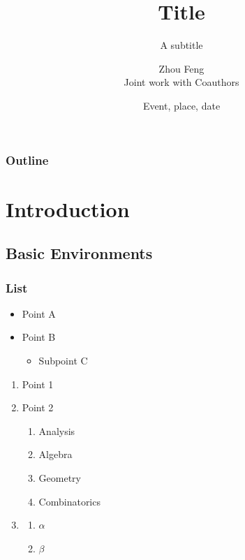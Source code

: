 \documentclass{beamer}
\title[]{Title}
\subtitle{A subtitle}
\author[Z. Feng]{Zhou Feng \\ \vspace{0.5em} Joint work with Coauthors}
\institute[Technion]{Technion -- Israel Institute of Technology}
\date{\footnotesize{Event, place, date} %
} %
\begin{document}
	
\begin{frame}[plain]
	\maketitle
\end{frame}

\begin{frame}\label{contents}
	\frametitle{Outline}
	\tableofcontents
\end{frame}


\section{Introduction} \label{sec:intro}

\subsection{Basic Environments}
\begin{frame}
	\frametitle{List}
	\begin{itemize}
		\item Point A
		\item Point B
		      \begin{itemize}
			      \item Subpoint C
		      \end{itemize}
	\end{itemize}

	\begin{enumerate}
		\item Point 1 \pause
		\item Point 2
		      \begin{enumerate}[I]
			      \item Analysis
			      \item Algebra
			      \item Geometry
			      \item Combinatorics
		      \end{enumerate}
		\item
		      \begin{enumerate}[i]
			      \item $ \alpha $
			      \item $ \beta $
		      \end{enumerate}
	\end{enumerate}

\end{frame}
\end{document}
